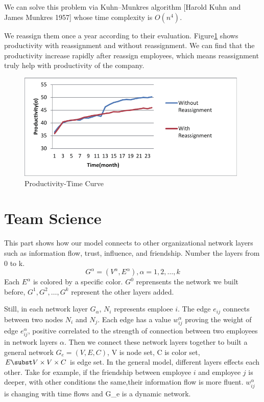 \documentclass[12pt,a4paper,titlepage]{article}
\begin{document}
We can solve this problem via Kuhn–Munkres algorithm [Harold Kuhn and
James Munkres 1957] whose time complexity is $O(n^4)$.

We reassign them once a year according to their
evaluation. Figure\ref{reassign} shows productivity with reassignment
and without reassignment. We can find that the productivity increase
rapidly after reassign employees, which means reassignment truly help
with productivity of the company.

\begin{figure}[htb]
  \centering
  \includegraphics[width=11cm]{p3.pdf}
  \caption{Productivity-Time Curve}\label{reassign}
\end{figure}

\section{Team Science}
\label{sec:team-science}

This part shows how our model connects to other organizational network
layers such as information flow, trust, influence, and
friendship. Number the layers from 0 to
k. $$G^\alpha=(V^\alpha,E^\alpha), \alpha=1,2,\ldots,k$$ Each
$E^\alpha$ is colored by a specific color. $G^0$ reprensents the
network we built before, $G^1, G^2, \ldots ,G^k$ represent the other layers added.

Still, in each network layer $G_\alpha$, $N_i$ represents emploee
$i$. The edge $e_{ij}$ connects between two nodes $N_i$ and
$N_j$. Each edge has a value $w_{ij}^\alpha$ proving the weight of
edge $e_{ij}^\alpha$, positive correlated to the strength of
connection between two employees in network layers $\alpha$. Then we
connect these network layers together to built a general network
$G_e=(V, E, C)$, V is node set, C is color set, $E\subst V\times
V\times C$ is edge set. In the general model, different layers effects
each other. Take for example, if the friendship between employee $i$
and employee $j$ is deeper, with other conditions the same,their
information flow is more fluent. $w_{ij}^\alpha$ is changing with time
flows and G_e is a dynamic network.
\end{document}
